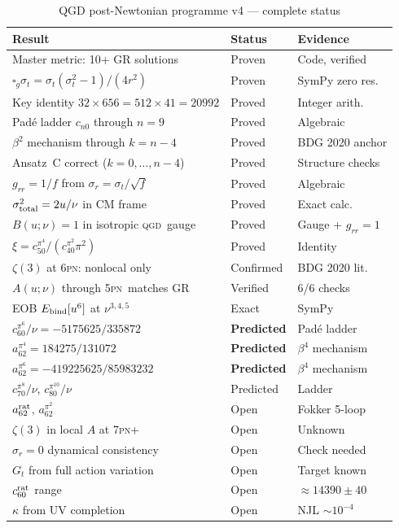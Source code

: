 \documentclass[11pt,a4paper]{article}
\theoremstyle{plain}
\theoremstyle{remark}
\newcommand{\QGD}{\textsc{qgd}}
\newcommand{\PN}{\textsc{pn}}
\begin{document}
\begin{table}[h]
\centering
\caption{QGD post-Newtonian programme v4 --- complete status}
\renewcommand{\arraystretch}{1.2}
\begin{tabular}{p{7.0cm}p{2.5cm}p{3.5cm}}
\toprule
\textbf{Result} & \textbf{Status} & \textbf{Evidence} \\
\midrule
Master metric: 10+ GR solutions & Proven & Code, verified \\
$\square_g\sigma_t = \sigma_t(\sigma_t^2-1)/(4r^2)$ & Proven & SymPy zero res. \\
Key identity $32\times656=512\times41=20992$ & Proved & Integer arith. \\
Pad\'e ladder $c_{n0}$ through $n=9$ & Proved & Algebraic \\
$\beta^2$ mechanism through $k=n-4$ & Proved & BDG 2020 anchor \\
Ansatz~C correct ($k=0,\ldots,n-4$) & Proved & Structure checks \\
$g_{rr}=1/f$ from $\sigma_r=\sigma_t/\sqrt{f}$ & Proved & Algebraic \\
$\sigma_{\rm total}^2 = 2u/\nu$ in CM frame & Proved & Exact calc. \\
$B(u;\nu)=1$ in isotropic \QGD\ gauge & Proved & Gauge + $g_{rr}=1$ \\
$\xi = c_{50}^{\pi^4}/(c_{40}^{\pi^2}\pi^2)$ & Proved & Identity \\
$\zeta(3)$ at 6\PN: nonlocal only & Confirmed & BDG 2020 lit. \\
$A(u;\nu)$ through 5\PN\ matches GR & Verified & 6/6 checks \\
EOB $E_{\rm bind}[u^6]$ at $\nu^{3,4,5}$ & Exact & SymPy \\
\midrule
$c_{60}^{\pi^6}/\nu = -5175625/335872$ & \textbf{Predicted} & Pad\'e ladder \\
$a_{62}^{\pi^4} = 184275/131072$ & \textbf{Predicted} & $\beta^4$ mechanism \\
$a_{62}^{\pi^6} = -419225625/85983232$ & \textbf{Predicted} & $\beta^4$ mechanism \\
$c_{70}^{\pi^8}/\nu$, $c_{80}^{\pi^{10}}/\nu$ & Predicted & Ladder \\
\midrule
$a_{62}^{\rm rat}$, $a_{62}^{\pi^2}$ & Open & Fokker 5-loop \\
$\zeta(3)$ in local $A$ at 7\PN+ & Open & Unknown \\
$\sigma_r=0$ dynamical consistency & Open & Check needed \\
$G_t$ from full action variation & Open & Target known \\
$c_{60}^{\rm rat}$ range & Open & $\approx14390\pm40$ \\
$\kappa$ from UV completion & Open & NJL $\sim10^{-4}$ \\
\bottomrule
\end{tabular}
\end{table}
\end{document}
